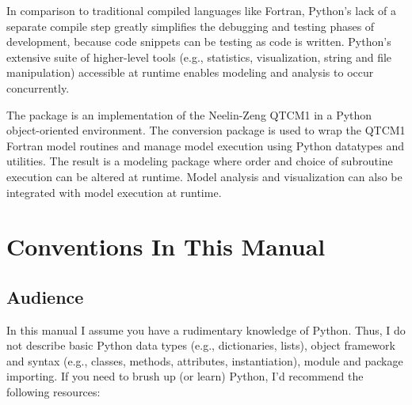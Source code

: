 In comparison to traditional compiled languages like Fortran,
Python's lack of a separate compile step greatly simplifies the
debugging and testing phases of development, because code snippets
can be testing as code is written.
Python's extensive suite of higher-level tools (e.g., statistics,
visualization, string and file manipulation) accessible at runtime 
enables modeling and analysis to occur concurrently.  

The  package is an implementation of the Neelin-Zeng
QTCM1 in a Python object-oriented environment.  The conversion
package
 is
used to wrap the QTCM1 Fortran model routines and manage model
execution using Python datatypes and utilities.  The result is a
modeling package where order and choice of subroutine execution can
be altered at runtime.  Model analysis and visualization can also
be integrated with model execution at runtime.




\section{Conventions In This Manual}

	\subsection{Audience}

In this manual I assume you have a rudimentary knowledge of Python.
Thus, I do not describe basic Python data types (e.g., dictionaries,
lists), object framework and syntax (e.g., classes, methods,
attributes, instantiation), module and package importing.  If you
need to brush up (or learn) Python, I'd recommend the following
resources:

